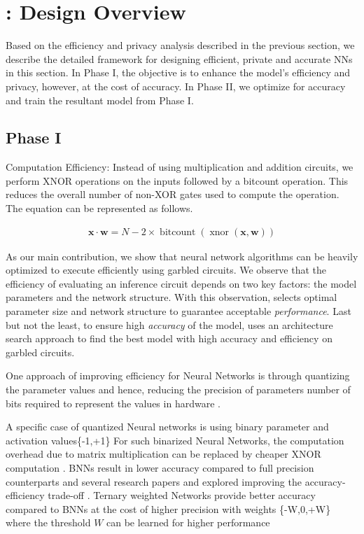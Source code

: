 \section{\method: Design Overview}\label{design}

Based on the efficiency and privacy analysis described in the previous section, we describe the detailed \method\hspace{0.02in} framework for designing efficient, private and accurate NNs in this section.
In Phase I, the objective is to enhance the model's efficiency and privacy, however, at the cost of accuracy.
In Phase II, we optimize for accuracy and train the resultant model from Phase I.


\subsection{Phase I}

Computation Efficiency:
Instead of using multiplication and addition circuits, we perform XNOR operations on the inputs followed by a bitcount operation. This reduces the overall number of non-XOR gates used to compute the operation. The equation can be represented as follows.

\begin{align}
\mathbf{x} \cdot \mathbf{w} =
N - 2\times\operatorname{bitcount}(\operatorname{xnor}(\mathbf{x}, \mathbf{w}))
\end{align}

As our main contribution, we show that neural network algorithms can be heavily optimized to execute efficiently using garbled circuits. We observe that the efficiency of evaluating an inference circuit depends on two key factors: the model parameters and the network structure.  With this observation,  selects optimal parameter size and network structure to guarantee acceptable {\em performance}. Last but not the least, to ensure high {\em accuracy} of the model,  uses an architecture search approach to find the best model with high accuracy and efficiency on garbled circuits.

One approach of improving efficiency for Neural Networks is through quantizing the parameter values and hence, reducing the precision of parameters number of bits required to represent the values in hardware \cite{Hubara:2017:QNN:3122009.3242044}.

A specific case of quantized Neural networks is using binary parameter and activation values\{-1,+1\} \cite{NIPS2016_6573}\cite{NIPS2015_5647}
For such binarized Neural Networks, the computation overhead due to matrix multiplication can be replaced by cheaper XNOR computation \cite{rastegari2016xnornet}\cite{DBLP:journals/corr/ZhouNZWWZ16}.
BNNs result in lower accuracy compared to full precision counterparts and several research papers and explored improving the accuracy-efficiency trade-off \cite{AAAI1714619}.
Ternary weighted Networks provide better accuracy compared to BNNs at the cost of higher precision with weights \{-W,0,+W\} where the threshold $W$ can be learned for higher performance \cite{DBLP:journals/corr/ZhuHMD16}\cite{Li2016TernaryWN}

